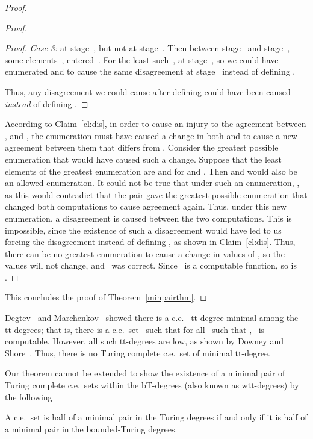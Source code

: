 \documentclass{LMCS}
\newcommand{\0}{\mathbf{0}}
\newcommand{\ce}{c.e.\ }
\newcommand{\<}{\langle}
\renewcommand{\>}{\rangle}
\begin{document}
\begin{proof}
\begin{proof}
\begin{proof}
\smallskip
{\em Case 3:}  at stage~, but not at stage~.  Then between
stage~ and stage~, some elements~,  entered~.  For the
least such~,  at stage~, so we could have enumerated
 and  to cause the same disagreement at
stage~ instead of defining .





Thus, any disagreement we could cause after defining  could have
been caused {\em instead} of defining .
\end{proof}

According to Claim~\ref{cl:dis}, in order to cause an injury to the agreement
between ,  and , the
enumeration must have caused a change in both  and
 to cause a new agreement between them that differs from
.  Consider the greatest possible enumeration that would have
caused such a change. Suppose that the least elements of the greatest
enumeration are  and  for  and
.  Then  and  would also be an
allowed enumeration. It could not be true that under such an enumeration,
, as this would contradict that the pair
 gave the greatest possible enumeration that changed
both computations to cause agreement again.  Thus, under this new
enumeration, a disagreement is caused between the two computations.  This is
impossible, since the existence of such a disagreement would have led to us
forcing the disagreement instead of defining , as shown in
Claim~\ref{cl:dis}.  Thus, there can be no greatest enumeration to cause a
change in values of , so the values will not change,
and~ was correct.  Since~ is a computable function, so is
.
\end{proof}

This concludes the proof of Theorem~\ref{minpairthm}.
\end{proof}

Degtev~\cite{Degtev} and Marchenkov~\cite{Marchenkov} showed there is a \ce
tt-degree minimal among the tt-degrees; that is, there is a \ce set~ such
that for all~ such that , ~is computable.  However, all
such tt-degrees are low, as shown by Downey and Shore~\cite{DS}. Thus,
there is no Turing complete \ce set of minimal tt-degree.

Our theorem cannot be extended to show the existence of a minimal pair of
Turing complete \ce sets within the bT-degrees (also known as wtt-degrees) by
the following

\begin{thm}
A \ce set is half of a minimal pair in the Turing degrees if and only if it
is half of a minimal pair in the bounded-Turing degrees.
\end{thm}
\end{document}
